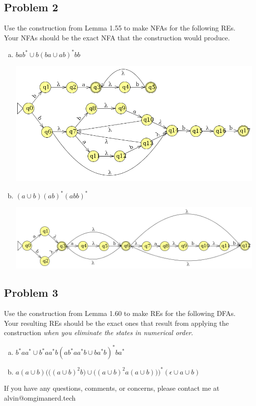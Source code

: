 \documentclass{math}
\begin{document}
\subsection*{Problem 2}
Use the construction from Lemma 1.55 to make NFAs for the following REs. Your
NFAs should be the exact NFA that the construction would produce.
\begin{enumerate}[(a)]
  \item \( bab^*\cup b(ba\cup ab)^*bb \)
  \begin{center}
    \includegraphics[width=16cm]{assets/hw_7_2a.png}
  \end{center}
  \item \( (a\cup b)(ab)^*(abb)^* \)
  \begin{center}
    \includegraphics[width=16cm]{assets/hw_7_2b.png}
  \end{center}
\end{enumerate}

\subsection*{Problem 3}
Use the construction from Lemma 1.60 to make REs for the following DFAs. Your
resulting REs should be the exact ones that result from applying the
construction \textit{when you eliminate the states in numerical order}.
\begin{enumerate}[(a)]
  \item \( b^*aa^*\cup b^*aa^*b(ab^*aa^*b\cup ba^*b)^*ba^* \)
  \item \( a(a\cup b)\Bigg(\big((a\cup b)^2b\big)\cup\big((a\cup b)^2a(a\cup b)\big)\Bigg)^*
    (\epsilon\cup a\cup b) \)
\end{enumerate}

\begin{center}
  If you have any questions, comments, or concerns, please contact me at
  alvin@omgimanerd.tech
\end{center}
\end{document}

